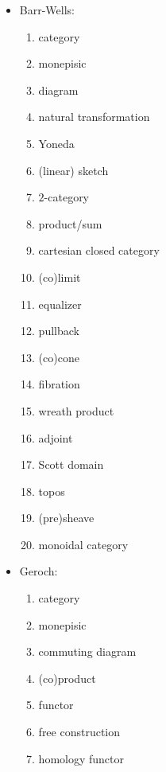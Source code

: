 \documentclass[11pt,openany]{book}
\begin{document}
\begin{itemize}
\item Barr-Wells:~\cite{BarrWells:2020}
\begin{enumerate}
  \item category
  \item monepisic
  \item diagram
  \item natural transformation
  \item Yoneda
  \item (linear) sketch
  \item $2$-category
  \item product/sum
  \item cartesian closed category
  \item (co)limit
  \item equalizer
  \item pullback
  \item (co)cone
  \item fibration
  \item wreath product
  \item adjoint
  \item Scott domain
  \item topos
  \item (pre)sheave
  \item monoidal category
\end{enumerate}

\item Geroch:\cite{Geroch:1985:MathPhysics}
\begin{enumerate}
  \item category
  \item monepisic
  \item commuting diagram
  \item (co)product
  \item functor
  \item free construction
  \item homology functor
\end{enumerate}


\end{itemize}
\end{document}
